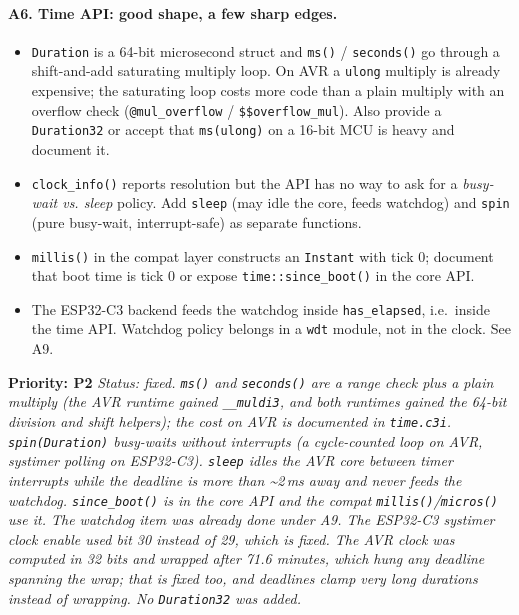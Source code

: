 \documentclass[11pt,a4paper]{article}
\newcommand{\pkg}[1]{\texttt{#1}}
\newcommand{\prio}[1]{\textbf{Priority: #1}}
\begin{document}
\paragraph{A6. Time API: good shape, a few sharp edges.}
\begin{itemize}
  \item \pkg{Duration} is a 64-bit microsecond struct and \pkg{ms()} / \pkg{seconds()} go through a
        shift-and-add saturating multiply loop. On AVR a \pkg{ulong} multiply is already expensive;
        the saturating loop costs more code than a plain multiply with an overflow check
        (\pkg{@mul\_overflow} / \pkg{\$\$overflow\_mul}). Also provide a \pkg{Duration32} or
        accept that \pkg{ms(ulong)} on a 16-bit MCU is heavy and document it.
  \item \pkg{clock\_info()} reports resolution but the API has no way to ask for a
        \emph{busy-wait vs. sleep} policy. Add \pkg{sleep} (may idle the core, feeds watchdog) and
        \pkg{spin} (pure busy-wait, interrupt-safe) as separate functions.
  \item \pkg{millis()} in the compat layer constructs an \pkg{Instant} with tick 0; document
        that boot time is tick 0 or expose \pkg{time::since\_boot()} in the core API.
  \item The ESP32-C3 backend feeds the watchdog inside \pkg{has\_elapsed}, i.e.\ inside the time
        API. Watchdog policy belongs in a \pkg{wdt} module, not in the clock. See A9.
\end{itemize}
\prio{P2}
\textit{Status: fixed. \pkg{ms()} and \pkg{seconds()} are a range check plus a plain multiply (the AVR runtime gained \pkg{\_\_muldi3}, and both runtimes gained the 64-bit division and shift helpers); the cost on AVR is documented in \pkg{time.c3i}. \pkg{spin(Duration)} busy-waits without interrupts (a cycle-counted loop on AVR, systimer polling on ESP32-C3). \pkg{sleep} idles the AVR core between timer interrupts while the deadline is more than \textasciitilde 2\,ms away and never feeds the watchdog. \pkg{since\_boot()} is in the core API and the compat \pkg{millis()}/\pkg{micros()} use it. The watchdog item was already done under A9. The ESP32-C3 systimer clock enable used bit 30 instead of 29, which is fixed. The AVR clock was computed in 32 bits and wrapped after 71.6 minutes, which hung any deadline spanning the wrap; that is fixed too, and deadlines clamp very long durations instead of wrapping. No \pkg{Duration32} was added.}
\end{document}
